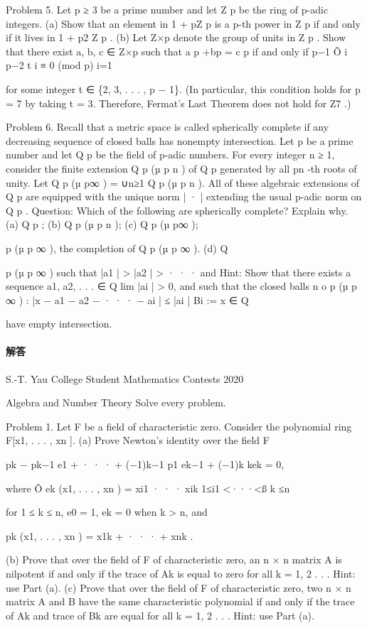 \documentclass[UTF8,12pt]{ctexart}
\begin{document}
Problem 5. Let p ≥ 3 be a prime number and let Z p be the ring of p-adic integers. (a) Show that an element in 1 + pZ p is a p-th power in Z p if and only if it lives in 1 + p2 Z p . (b) Let Z×p denote the group of units in Z p . Show that there exist a, b, c ∈ Z×p such that a p +bp = c p if and only if p−1 Õ i p−2 t i ≡ 0 (mod p) i=1

for some integer t ∈ \{2, 3, . . . , p − 1\}. (In particular, this condition holds for p = 7 by taking t = 3. Therefore, Fermat’s Last Theorem does not hold for Z7 .)

Problem 6. Recall that a metric space is called spherically complete if any decreasing sequence of closed balls has nonempty intersection. Let p be a prime number and let Q p be the field of p-adic numbers. For every integer n ≥ 1, consider the finite extension Q p (µ p n ) of Q p generated by all pn -th roots of unity. Let Q p (µ p∞ ) = ∪n≥1 Q p (µ p n ). All of these algebraic extensions of Q p are equipped with the unique norm | · | extending the usual p-adic norm on Q p . Question: Which of the following are spherically complete? Explain why. (a) Q p ; (b) Q p (µ p n ); (c) Q p (µ p∞ );

p (µ p ∞ ), the completion of Q p (µ p ∞ ). (d) Q

p (µ p ∞ ) such that |a1 | > |a2 | > · · · and Hint: Show that there exists a sequence a1, a2, . . . ∈ Q lim |ai | > 0, and such that the closed balls n o p (µ p ∞ ) : |x − a1 − a2 − · · · − ai | ≤ |ai | Bi := x ∈ Q

have empty intersection.

\paragraph{解答}

S.-T. Yau College Student Mathematics Contests 2020

Algebra and Number Theory Solve every problem.

Problem 1. Let F be a field of characteristic zero. Consider the polynomial ring F[x1, . . . , xn ]. (a) Prove Newton’s identity over the field F

pk − pk−1 e1 + · · · + (−1)k−1 p1 ek−1 + (−1)k kek = 0,

where Õ ek (x1, . . . , xn ) = xi1 · · · xik 1≤i1 <···<ß k ≤n

for 1 ≤ k ≤ n, e0 = 1, ek = 0 when k > n, and

pk (x1, . . . , xn ) = x1k + · · · + xnk .

(b) Prove that over the field of F of characteristic zero, an n × n matrix A is nilpotent if and only if the trace of Ak is equal to zero for all k = 1, 2 . . . Hint: use Part (a). (c) Prove that over the field of F of characteristic zero, two n × n matrix A and B have the same characteristic polynomial if and only if the trace of Ak and trace of Bk are equal for all k = 1, 2 . . . Hint: use Part (a).
\end{document}
